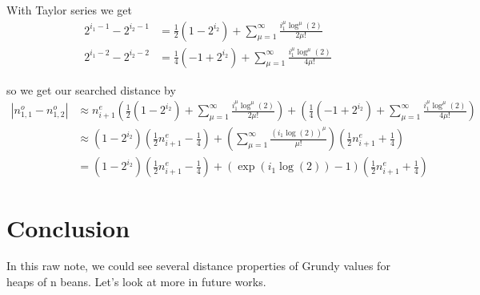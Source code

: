 \documentclass[12pt]{../document-templates/papers/one-column-mydashie/mydashie}
\newtheorem*{theorem A}{Theorem A}
\newtheorem*{theorem B}{N\"olker's Theorem}
\theoremstyle{remark}
\theoremstyle{remark}
\begin{document}
With Taylor series we get
\begin{equation}
    \begin{split}
        2^{i_{1} - 1} - 2^{i_{2} - 1} &= \frac{1}{2}\left(1 - 2^{i_{2}}\right) + \sum_{\mu = 1}^{\infty} \frac{i_{1}^{\mu}\log^{\mu}\left(2\right)}{2\mu!}\\
        2^{i_{1} - 2} - 2^{i_{2} - 2} &= \frac{1}{4}\left(-1 + 2^{i_{2}}\right) + \sum_{\mu = 1}^{\infty} \frac{i_{1}^{\mu}\log^{\mu}\left(2\right)}{4\mu!}
    \end{split}
\label{eq:taylor}
\end{equation}

so we get our searched distance by
\begin{equation}
    \begin{split}
        |n_{1,1}^{o} - n_{1,2}^{o}| &\approx n_{i+1}^{e}\left(\frac{1}{2}\left(1 - 2^{i_{2}}\right) + \sum_{\mu = 1}^{\infty} \frac{i_{1}^{\mu}\log^{\mu}\left(2\right)}{2\mu!}\right) + \left(\frac{1}{4}\left(-1 + 2^{i_{2}}\right) + \sum_{\mu = 1}^{\infty} \frac{i_{1}^{\mu}\log^{\mu}\left(2\right)}{4\mu!}\right)\\
            &\approx \left(1-2^{i_{2}}\right)\left(\frac{1}{2}n_{i+1}^{e} - \frac{1}{4}\right) + \left(\sum_{\mu = 1}^{\infty}\frac{\left(i_{1}\log\left(2\right)\right)^{\mu}}{\mu!}\right)\left(\frac{1}{2}n_{i+1}^{e} + \frac{1}{4}\right)\\
            &= \left(1 - 2^{i_{2}}\right)\left(\frac{1}{2}n_{i+1}^{e} - \frac{1}{4}\right) + \left(\exp\left(i_{1}\log\left(2\right)\right) - 1\right)\left(\frac{1}{2}n_{i+1}^{e} + \frac{1}{4}\right)
    \end{split}
\label{eq:samenumberapp_p2}
\end{equation}
\section{Conclusion}
\label{s:conclusion}
In this raw note, we could see several distance properties of Grundy values for heaps of n beans. Let's look at more in future works.
\end{document}
